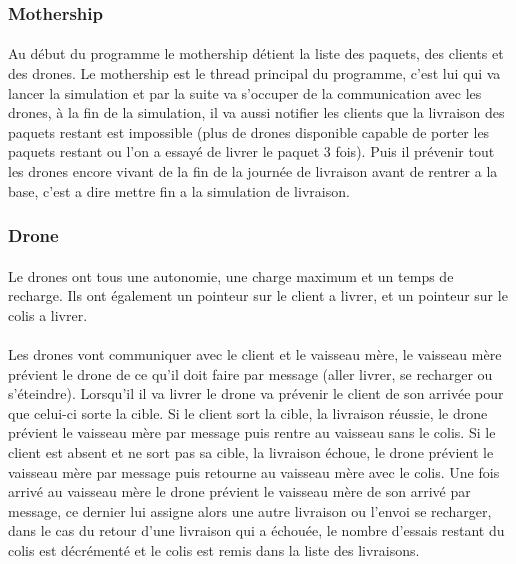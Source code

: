 \documentclass[article, backcover, french, nodocumentinfo]{upmethodology-document}
\begin{document}
			\subsubsection{Mothership}
				\paragraph*{}
					Au début du programme le mothership détient la liste des paquets, des clients et des drones.
					Le mothership est le thread principal du programme, c'est lui qui va lancer la simulation et par la suite va s'occuper de
					la communication avec les drones, à la fin de la simulation, il va aussi notifier les clients que la livraison des paquets
					restant est impossible (plus de drones disponible capable de porter les paquets restant ou l'on a essayé de livrer le paquet 3 fois).
					Puis il prévenir tout les drones encore vivant de la fin de la journée de livraison avant de rentrer a la base, c'est a dire mettre
					fin a la simulation de livraison.
			\subsubsection{Drone}
				\paragraph*{}
					Le drones ont tous une autonomie, une charge maximum et un temps de recharge. Ils ont également un pointeur sur le client a livrer,
					et un pointeur sur le colis a livrer.
				\paragraph*{}
					Les drones vont communiquer avec le client et le vaisseau mère, le vaisseau mère prévient le drone de ce qu'il doit faire par message (aller livrer, se recharger ou s'éteindre). Lorsqu'il il va livrer le drone va prévenir le client de son arrivée pour que celui-ci sorte la cible. Si le client sort la cible, la livraison réussie, le drone prévient le vaisseau mère par message puis rentre au vaisseau sans le colis. Si le client est absent et ne sort pas sa cible, la livraison échoue, le drone prévient le vaisseau mère par message puis retourne au vaisseau mère avec le colis. Une fois arrivé au vaisseau mère le drone prévient le vaisseau mère de son arrivé par message, ce dernier lui assigne alors une autre livraison ou l'envoi se recharger, dans le cas du retour d'une livraison qui a échouée, le nombre d'essais restant du colis est décrémenté et le colis est remis dans la liste des livraisons.
\end{document}
